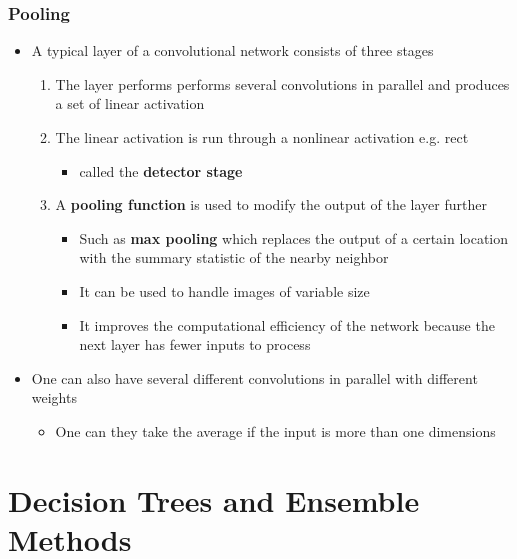 \documentclass[a4, english]{article}
\begin{document}
\subsubsection{Pooling}
\begin{itemize}
	\item A typical layer of a convolutional network consists of three stages 
  \begin{enumerate}
  	\item The layer performs performs several convolutions in parallel and produces a set of linear activation
    \item The linear activation is run through a nonlinear activation e.g. rect 
    \begin{itemize}
    	\item called the \textbf{detector stage}
    \end{itemize}
    \item A \textbf{pooling function} is used to modify the output of the layer further
    \begin{itemize}
      \item Such as \textbf{max pooling} which replaces the output of a certain location with the summary statistic of the nearby neighbor
      \item It can be used to handle images of variable size
      \item It improves the computational efficiency of the network because the next layer has fewer inputs to process
    \end{itemize}
  \end{enumerate}
  \item One can also have several different convolutions in parallel with different weights
  \begin{itemize}
  	\item One can they take the average if the input is more than one dimensions 
  \end{itemize}
\end{itemize}

\newpage

\section{Decision Trees and Ensemble Methods}
\end{document}
